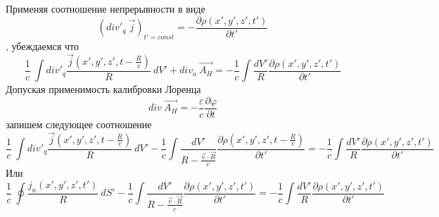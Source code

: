 \documentclass[11pt]{article}
\begin{document}
Применяя соотношение непрерывности в виде
\[{{\left( div{{'}_{q}}\ \overrightarrow{j} \right)}_{t'=const}}=-\frac{\partial \rho \left( x',y',z',t' \right)}{\partial t'}\],
убеждаемся что
\[\frac{1}{c}\ \int{div{{'}_{q}}\frac{\overrightarrow{j}\left( x',y',z',t-\frac{R}{v} \right)}{R}}\ dV'+di{{v}_{a}}\ \overrightarrow{{{A}_{H}}}=-\frac{1}{c}\int{\frac{dV'}{R}}\frac{\partial \rho \left( x',y',z',t' \right)}{\partial t'}\]
Допуская применимость калибровки Лоренца
\[div\ \overrightarrow{{{A}_{H}}}=-\frac{\varepsilon }{c}\frac{\partial \varphi }{\partial t}\]
запишем следующее соотношение
\[\frac{1}{c}\ \int{div{{'}_{q}}\frac{\overrightarrow{j}\left( x',y',z',t-\frac{R}{v} \right)}{R}}\ dV'-\frac{1}{c}\int{\frac{dV'}{R-\frac{\overrightarrow{v}\cdot \overrightarrow{R}}{c}}\frac{\partial \rho \left( x',y',z',t-\frac{R}{v} \right)}{\partial t'}}=-\frac{1}{c}\int{\frac{dV'}{R}}\frac{\partial \rho \left( x',y',z',t' \right)}{\partial t'}\]
Или
\[\frac{1}{c}\ \oint{\frac{{{j}_{n}}\left( x',y',z',t' \right)}{R}}\ dS'-\frac{1}{c}\int{\frac{dV'}{R-\frac{\overrightarrow{v}\cdot \overrightarrow{R}}{c}}\frac{\partial \rho \left( x',y',z',t' \right)}{\partial t'}}=-\frac{1}{c}\int{\frac{dV'}{R}}\frac{\partial \rho \left( x',y',z',t' \right)}{\partial t'}\]
\end{document}
